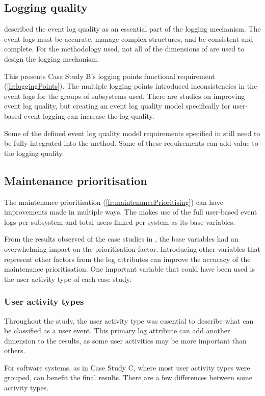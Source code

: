 \subsection{Logging quality}
 described the event log quality as an essential part of the logging mechanism. The event logs must be accurate, manage complex structures, and be consistent and complete. For the methodology used, not all of the dimensions of  are used to design the logging mechanism.\par This presents Case Study B's logging points functional requirement (\ref{fr:loggingPoints}). The multiple logging points introduced inconsistencies in the event logs for the groups of subsystems used. There are studies on improving event log quality, but creating an event log quality model specifically for user-based event logging can increase the log quality. \par Some of the defined event log quality model requirements specified in  still need to be fully integrated into the method. Some of these requirements can add value to the logging quality.

\subsection{Maintenance prioritisation}
The maintenance prioritisation (\ref{fr:maintenancePrioritising}) can have improvements made in multiple ways. The  makes use of the full user-based event logs per subsystem and total users linked per system as its base variables.\par From the results observed of the case studies in , the base variables had an overwhelming impact on the prioritisation factor. Introducing other variables that represent other factors from the log attributes can improve the accuracy of the maintenance prioritisation. One important variable that could have been used is the user activity type of each case study.

\subsubsection{User activity types}
Throughout the study, the user activity type was essential to describe what can be classified as a user event. This primary log attribute can add another dimension to the results, as some user activities may be more important than others. \par For software systems, as in Case Study C, where most user activity types were grouped, can benefit the final results. There are a few differences between some activity types. 

